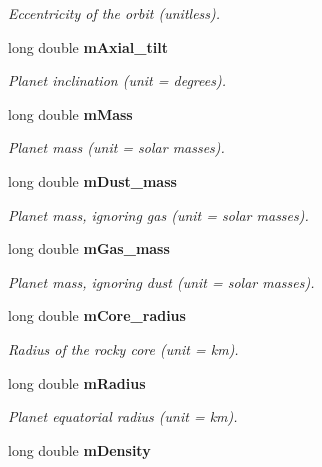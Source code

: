 \begin{CompactItemize}
\begin{CompactList}\small\item\em Eccentricity of the orbit (unitless). \item\end{CompactList}\item 
long double {\bf m\-Axial\_\-tilt}\label{class_s_g___planet_p7}

\begin{CompactList}\small\item\em Planet inclination (unit = degrees). \item\end{CompactList}\item 
long double {\bf m\-Mass}\label{class_s_g___planet_p8}

\begin{CompactList}\small\item\em Planet mass (unit = solar masses). \item\end{CompactList}\item 
long double {\bf m\-Dust\_\-mass}\label{class_s_g___planet_p9}

\begin{CompactList}\small\item\em Planet mass, ignoring gas (unit = solar masses). \item\end{CompactList}\item 
long double {\bf m\-Gas\_\-mass}\label{class_s_g___planet_p10}

\begin{CompactList}\small\item\em Planet mass, ignoring dust (unit = solar masses). \item\end{CompactList}\item 
long double {\bf m\-Core\_\-radius}\label{class_s_g___planet_p11}

\begin{CompactList}\small\item\em Radius of the rocky core (unit = km). \item\end{CompactList}\item 
long double {\bf m\-Radius}\label{class_s_g___planet_p12}

\begin{CompactList}\small\item\em Planet equatorial radius (unit = km). \item\end{CompactList}\item 
long double {\bf m\-Density}\label{class_s_g___planet_p13}


\end{CompactItemize}
